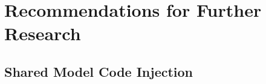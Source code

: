 \section{Recommendations for Further Research}

\subsection{Shared Model Code Injection}
\label{sub:model_code_injection}